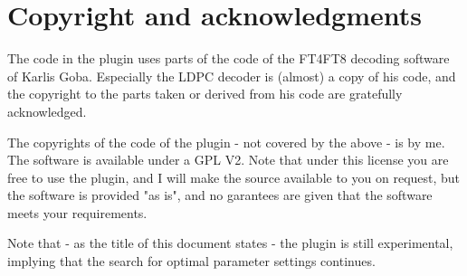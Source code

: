 \documentclass[11pt]{article}
\begin{document}
\section{Copyright and acknowledgments}

The code in the plugin uses parts of the code of the FT4FT8 decoding
software of Karlis Goba.
Especially the LDPC decoder is (almost) a copy of his code, and the copyright
to the parts taken or derived from his code are gratefully acknowledged.

The copyrights of the code of the plugin - not covered by the above -
is by me.
The software is available under a GPL V2.
Note that under this license you are free to use the plugin, and
I will make the source available to you on request,  but the software is provided "as is",
and no garantees are given that the software meets your requirements.
\par
Note that - as the title of this document states - the plugin is still
experimental, implying that the search for optimal parameter settings continues.
\end{document}
